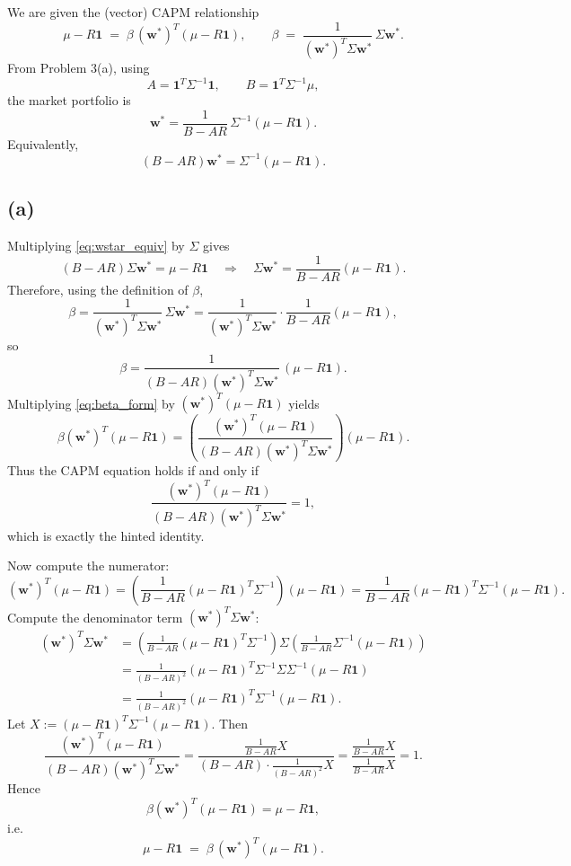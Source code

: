 \documentclass{article}
\begin{document}
We are given the (vector) CAPM relationship
\[
\mu - R\mathbf 1 \;=\; \beta\,(\mathbf w^\ast)^T(\mu - R\mathbf 1),
\qquad
\beta \;=\; \frac{1}{(\mathbf w^\ast)^T\Sigma \mathbf w^\ast}\,\Sigma \mathbf w^\ast.
\]
From Problem 3(a), using
\[
A=\mathbf 1^T\Sigma^{-1}\mathbf 1,
\qquad
B=\mathbf 1^T\Sigma^{-1}\mu,
\]
the market portfolio is
\[
\mathbf w^\ast=\frac{1}{B-AR}\,\Sigma^{-1}(\mu-R\mathbf 1).
\]
Equivalently,
\begin{equation}
\label{eq:wstar_equiv}
(B-AR)\mathbf w^\ast=\Sigma^{-1}(\mu-R\mathbf 1).
\end{equation}

\subsection*{(a)}

Multiplying \eqref{eq:wstar_equiv} by $\Sigma$ gives
\[
(B-AR)\Sigma \mathbf w^\ast=\mu-R\mathbf 1
\quad\Longrightarrow\quad
\Sigma \mathbf w^\ast=\frac{1}{B-AR}(\mu-R\mathbf 1).
\]
Therefore, using the definition of $\beta$,
\[
\beta
=
\frac{1}{(\mathbf w^\ast)^T\Sigma \mathbf w^\ast}\,\Sigma \mathbf w^\ast
=
\frac{1}{(\mathbf w^\ast)^T\Sigma \mathbf w^\ast}\cdot \frac{1}{B-AR}(\mu-R\mathbf 1),
\]
so
\begin{equation}
\label{eq:beta_form}
\beta
=
\frac{1}{(B-AR)(\mathbf w^\ast)^T\Sigma \mathbf w^\ast}\,(\mu-R\mathbf 1).
\end{equation}
Multiplying \eqref{eq:beta_form} by $(\mathbf w^\ast)^T(\mu-R\mathbf 1)$ yields
\[
\beta(\mathbf w^\ast)^T(\mu-R\mathbf 1)
=
\left(
\frac{(\mathbf w^\ast)^T(\mu-R\mathbf 1)}{(B-AR)(\mathbf w^\ast)^T\Sigma \mathbf w^\ast}
\right)(\mu-R\mathbf 1).
\]
Thus the CAPM equation holds if and only if
\[
\frac{(\mathbf w^\ast)^T(\mu-R\mathbf 1)}{(B-AR)(\mathbf w^\ast)^T\Sigma \mathbf w^\ast}=1,
\]
which is exactly the hinted identity.

Now compute the numerator:
\[
(\mathbf w^\ast)^T(\mu-R\mathbf 1)
=
\left(\frac{1}{B-AR}(\mu-R\mathbf 1)^T\Sigma^{-1}\right)(\mu-R\mathbf 1)
=
\frac{1}{B-AR}(\mu-R\mathbf 1)^T\Sigma^{-1}(\mu-R\mathbf 1).
\]
Compute the denominator term $(\mathbf w^\ast)^T\Sigma \mathbf w^\ast$:
\begin{align*}
(\mathbf w^\ast)^T\Sigma \mathbf w^\ast
&=
\left(\frac{1}{B-AR}(\mu-R\mathbf 1)^T\Sigma^{-1}\right)\Sigma
\left(\frac{1}{B-AR}\Sigma^{-1}(\mu-R\mathbf 1)\right)\\
&=
\frac{1}{(B-AR)^2}(\mu-R\mathbf 1)^T\Sigma^{-1}\Sigma\Sigma^{-1}(\mu-R\mathbf 1)\\
&=
\frac{1}{(B-AR)^2}(\mu-R\mathbf 1)^T\Sigma^{-1}(\mu-R\mathbf 1).
\end{align*}
Let $X:=(\mu-R\mathbf 1)^T\Sigma^{-1}(\mu-R\mathbf 1)$. Then
\[
\frac{(\mathbf w^\ast)^T(\mu-R\mathbf 1)}{(B-AR)(\mathbf w^\ast)^T\Sigma \mathbf w^\ast}
=
\frac{\frac{1}{B-AR}X}{(B-AR)\cdot \frac{1}{(B-AR)^2}X}
=
\frac{\frac{1}{B-AR}X}{\frac{1}{B-AR}X}
=
1.
\]
Hence
\[
\beta(\mathbf w^\ast)^T(\mu-R\mathbf 1)=\mu-R\mathbf 1,
\]
i.e.
\[
\boxed{
\mu - R\mathbf 1 \;=\; \beta\,(\mathbf w^\ast)^T(\mu - R\mathbf 1).
}
\]
\end{document}
